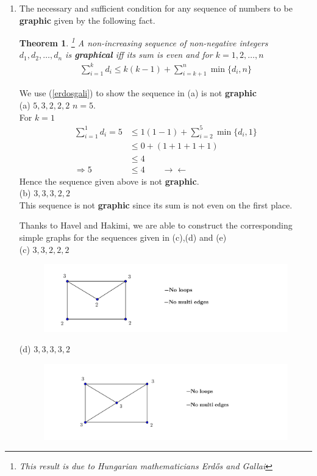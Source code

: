 \documentclass[paper=a4, fontsize=11pt,twoside]{scrartcl}		%
\newtheorem{thm}{Theorem}[section]
\theoremstyle{definition}
\theoremstyle{remark}
\begin{document}
\begin{enumerate}
  \item The necessary and sufficient condition for any sequence of numbers to be \textbf{graphic} given by the following fact.
  \begin{thm}\footnote{This result is due to Hungarian mathematicians Erd\H{o}s and Gallai}
  A non-increasing sequence of non-negative integers $d_1,d_2,\ldots,d_n$ is \textbf{graphical} iff its sum is even and for $k=1,2,\ldots,n$
  \begin{align}\label{erdosgali}
  \sum_{i=1}^{k}d_i\leq k(k-1)+\sum_{i=k+1}^{n}\min\{d_i,n\}
  \end{align}
  \end{thm}
  We use (\ref{erdosgali}) to show the sequence in (a) is not \textbf{graphic}\\
  \newpage
  (a) $5,3,2,2,2$ $n=5$.\\
  For $k=1$
  \begin{align*}
  \sum_{i=1}^{1}d_i=5&\leq 1(1-1)+\sum_{i=2}^{5}\min\{d_i,1\}\\
                     &\leq 0+(1+1+1+1)\\
                     &\leq 4\\
  \Rightarrow 5 &\leq 4 \qquad \rightarrow\leftarrow
  \end{align*}
  Hence the sequence given above is not \textbf{graphic}.\\
  (b) $3,3,3,2,2$\\
  This sequence is not \textbf{graphic} since its sum is not even on the first place.
  \medskip

  Thanks to Havel and Hakimi, we are able to construct the corresponding simple graphs for the sequences given in (c),(d) and (e)\\
  (c) $3,3,2,2,2$
\begin{figure}[hbt!]
\centering
\includegraphics[width=.9\textwidth]{SolGrapAssc.png}
\end{figure}

  (d) $3,3,3,3,2$

  \begin{figure}[hbt!]
\centering
\includegraphics[width=.9\textwidth]{SolGrapAssd.png}
\end{figure}


\end{enumerate}
\end{document}
